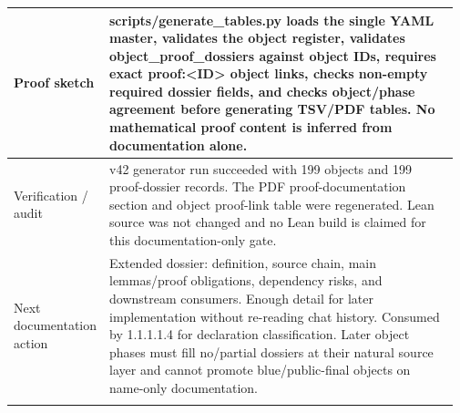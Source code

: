 \begin{longtable}{L{0.16\linewidth} L{0.81\linewidth}}
\hline\addlinespace[0.20em]
Proof sketch & scripts/\allowbreak{}generate\_tables.py loads the single YAML master, validates the object register, validates object\_proof\_dossiers against object IDs, requires exact proof:<ID> object links, checks non-empty required dossier fields, and checks object/\allowbreak{}phase agreement before generating TSV/\allowbreak{}PDF tables. No mathematical proof content is inferred from documentation alone.\\
\hline\addlinespace[0.20em]
Verification /\allowbreak{} audit & v42 generator run succeeded with 199 objects and 199 proof-dossier records. The PDF proof-documentation section and object proof-link table were regenerated. Lean source was not changed and no Lean build is claimed for this documentation-only gate.\\
\hline\addlinespace[0.20em]
Next documentation action & Extended dossier: definition, source chain, main lemmas/\allowbreak{}proof obligations, dependency risks, and downstream consumers. Enough detail for later implementation without re-reading chat history. Consumed by 1.1.1.1.4 for declaration classification. Later object phases must fill no/\allowbreak{}partial dossiers at their natural source layer and cannot promote blue/\allowbreak{}public-final objects on name-only documentation.\\
\hline\addlinespace[0.20em]
\end{longtable}
